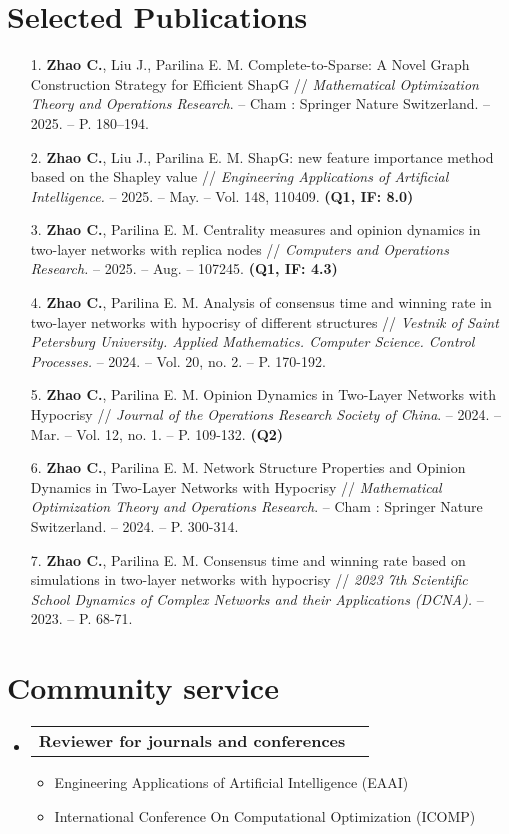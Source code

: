 \documentclass[letterpaper,10pt]{article}
\makeatletter
\newcommand{\resumeItem}[1]{
  \item\small{
    {#1 \vspace{-2pt}}
  }
}
\newcommand{\resumeProjectHeading}[2]{
  \item
  \begin{tabular*}{0.97\textwidth}{l@{\extracolsep{\fill}}r}
    \small#1 & #2 \\
  \end{tabular*}\vspace{-7pt}
}
\newenvironment{resumeSubHeadingList}{\begin{itemize}[leftmargin=0.15in, label={}]}{\end{itemize}}
\newenvironment{resumeItemList}{\begin{itemize}}{\end{itemize}}
\makeatother
\begin{document}
\section{Selected Publications}
\begin{enumerate}
  \fontsize{10}{10.5}\selectfont
  \item [1.] \textbf{Zhao C.}, Liu J., Parilina E. M. Complete-to-Sparse: A Novel Graph Construction Strategy for Efficient ShapG // {\it Mathematical Optimization Theory and Operations Research}. -- Cham : Springer Nature Switzerland. -- 2025. -- P. 180–194.
  \item [2.] \textbf{Zhao C.}, Liu J., Parilina E. M. ShapG: new feature importance method based on the Shapley value // {\it Engineering Applications of Artificial Intelligence.} -- 2025. -- May. -- Vol. 148, 110409. {\bf (Q1, IF: 8.0)}
  \item [3.] \textbf{Zhao C.}, Parilina E. M. Centrality measures and opinion dynamics in two-layer networks with replica nodes // {\it Computers and Operations Research.} -- 2025. -- Aug. -- 107245. {\bf (Q1, IF: 4.3)}
  \item [4.] \textbf{Zhao C.}, Parilina E. M. Analysis of consensus time and winning rate in two-layer networks with hypocrisy of different structures // {\it Vestnik of Saint Petersburg University. Applied Mathematics. Computer Science. Control Processes.} -- 2024. -- Vol. 20, no. 2. -- P. 170-192.
  \item [5.] \textbf{Zhao C.}, Parilina E. M. Opinion Dynamics in Two-Layer Networks with Hypocrisy // {\it Journal of the Operations Research Society of China}. -- 2024. -- Mar. -- Vol. 12, no. 1. -- P. 109-132. {\bf (Q2)}
  \item [6.] \textbf{Zhao C.}, Parilina E. M. Network Structure Properties and Opinion Dynamics in Two-Layer Networks with Hypocrisy // {\it Mathematical Optimization Theory and Operations Research}. -- Cham : Springer Nature Switzerland. -- 2024. -- P. 300-314.
  \item [7.] \textbf{Zhao C.}, Parilina E. M. Consensus time and winning rate based on simulations in two-layer networks with hypocrisy // {\it 2023 7th Scientific School Dynamics of Complex Networks and their Applications (DCNA).} -- 2023. -- P. 68-71.
\end{enumerate}

\section{Community service}
\begin{resumeSubHeadingList}
  \resumeProjectHeading{{\bf Reviewer for journals and conferences}}{}
  \begin{resumeItemList}
    \resumeItem{Engineering Applications of Artificial Intelligence (EAAI)}
    \resumeItem{International Conference On Computational Optimization (ICOMP)}
  \end{resumeItemList}
\end{resumeSubHeadingList}
\end{document}

